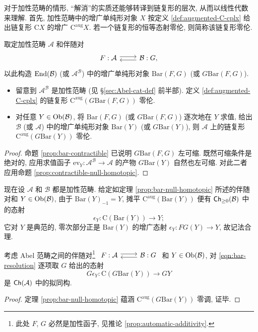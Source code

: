 对于加性范畴的情形, ``解消''的实质还能够转译到链复形的层次, 从而以线性代数来理解. 首先, 加性范畴中的增广单纯形对象 $X$ 按定义 \ref{def:augmented-C-cplx} 给出链复形 $\mathrm{C}X$ 的增广 $\mathrm{C}^{\mathrm{aug}} X$. 若一个链复形的恒等态射零伦, 则简称该链复形零伦.

\begin{theorem}\label{prop:bar-null-homotopic}
	取定加性范畴 $\mathcal{A}$ 和伴随对
	\[\begin{tikzcd}
		F : \mathcal{A} \arrow[shift left, r] & \mathcal{B}: G, \arrow[shift left, l]
	\end{tikzcd}\]
	以此构造 $\operatorname{End}(\mathcal{B})$ (或 $\mathcal{A}^{\mathcal{B}}$) 中的增广单纯形对象 $\mathrm{Bar}(F, G)$ (或 $G \mathrm{Bar}(F, G)$).
	\begin{itemize}
		\item 留意到 $\mathcal{A}^{\mathcal{B}}$ 是加性范畴 (见 \S\ref{sec:Abel-cat-def} 前半部). 定义 \ref{def:augmented-C-cplx} 的链复形 $\mathrm{C}^{\mathrm{aug}} \left( G \mathrm{Bar}(F, G) \right)$ 零伦.
		\item 对任意 $Y \in \operatorname{Ob}(\mathcal{B})$, 将 $\mathrm{Bar}(F, G)$ (或
		 $G \mathrm{Bar}(F, G)$) 逐次地在 $Y$ 求值, 给出 $\mathcal{B}$ (或 $\mathcal{A}$) 中的增广单纯形对象 $\mathrm{Bar}(Y)$ (或 $G \mathrm{Bar}(Y)$), 则 $\mathcal{A}$ 上的链复形 $\mathrm{C}^{\mathrm{aug}} \left( G \mathrm{Bar}(Y) \right)$ 零伦.
	\end{itemize} 
\end{theorem}
\begin{proof}
	命题 \ref{prop:bar-contractible} 已说明 $G\mathrm{Bar}(F, G)$ 左可缩. 既然可缩条件是绝对的, 应用求值函子 $\mathrm{ev}_Y: \mathcal{A}^{\mathcal{B}} \to \mathcal{A}$ 的产物 $G\mathrm{Bar}(Y)$ 自然也左可缩. 对此二者应用命题 \ref{prop:contractible-null-homotopic}.
\end{proof}

现在设 $\mathcal{A}$ 和 $\mathcal{B}$ 都是加性范畴. 给定如定理 \ref{prop:bar-null-homotopic} 所述的伴随对和 $Y \in \operatorname{Ob}(\mathcal{B})$, 由于 $\mathrm{Bar}(Y)_{-1} = Y$, 摊平 $\mathrm{C}^{\mathrm{aug}}(\mathrm{Bar}(Y))$ 便有 $\mathsf{Ch}_{\geq 0}(\mathcal{B})$ 中的态射
\begin{equation}\label{eqn:bar-resolution}
	\epsilon_Y: \mathrm{C}(\mathrm{Bar}(Y)) \to Y;
\end{equation}
它对 $Y$ 是典范的, 零次部分正是 $\mathrm{Bar}(Y)$ 的增广态射 $\epsilon_Y : FG(Y) \to Y$, 故记法合理.

\begin{corollary}\label{prop:bar-exactness-G}
	考虑 Abel 范畴之间的伴随对\footnote{此处 $F$, $G$ 必然是加性函子, 见推论 \ref{prop:automatic-additivity}.}
	$\begin{tikzcd}
		F : \mathcal{A} \arrow[shift left, r] & \mathcal{B}: G \arrow[shift left, l]
	\end{tikzcd}$
	和 $Y \in \operatorname{Ob}(\mathcal{B})$, 对 \eqref{eqn:bar-resolution} 逐项取 $G$ 给出的态射
	\[ G\epsilon_Y: \mathrm{C}(G\mathrm{Bar}(Y)) \to GY \]
	是 $\mathsf{Ch}(\mathcal{A})$ 中的拟同构.
\end{corollary}
\begin{proof}
	定理 \ref{prop:bar-null-homotopic} 蕴涵 $\mathrm{C}^{\mathrm{aug}}(G\mathrm{Bar}(Y))$ 零调, 证毕.
\end{proof}

